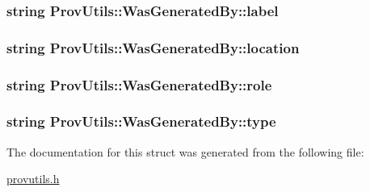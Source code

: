 \hypertarget{struct_prov_utils_1_1_was_generated_by_a9f6b81f45912688abbf99d928e7d8e8f}{
\subsubsection[{label}]{\setlength{\rightskip}{0pt plus 5cm}string Prov\-Utils\-::\-Was\-Generated\-By\-::label}}\label{struct_prov_utils_1_1_was_generated_by_a9f6b81f45912688abbf99d928e7d8e8f}
\hypertarget{struct_prov_utils_1_1_was_generated_by_a13dc655caf70af358f6971e430367995}{
\subsubsection[{location}]{\setlength{\rightskip}{0pt plus 5cm}string Prov\-Utils\-::\-Was\-Generated\-By\-::location}}\label{struct_prov_utils_1_1_was_generated_by_a13dc655caf70af358f6971e430367995}
\hypertarget{struct_prov_utils_1_1_was_generated_by_a2e51f173fa9aaa64cb2b98b4246e85fb}{
\subsubsection[{role}]{\setlength{\rightskip}{0pt plus 5cm}string Prov\-Utils\-::\-Was\-Generated\-By\-::role}}\label{struct_prov_utils_1_1_was_generated_by_a2e51f173fa9aaa64cb2b98b4246e85fb}
\hypertarget{struct_prov_utils_1_1_was_generated_by_a7a9540ee8718a4dfe0ff9a6f877e4ce5}{
\subsubsection[{type}]{\setlength{\rightskip}{0pt plus 5cm}string Prov\-Utils\-::\-Was\-Generated\-By\-::type}}\label{struct_prov_utils_1_1_was_generated_by_a7a9540ee8718a4dfe0ff9a6f877e4ce5}


The documentation for this struct was generated from the following file\-:\begin{DoxyCompactItemize}
\item 
\hyperlink{provutils_8h}{provutils.\-h}\end{DoxyCompactItemize}
